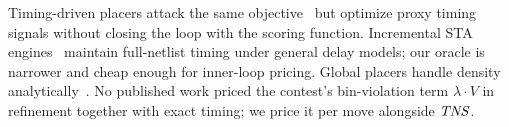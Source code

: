 Timing-driven placers attack the same objective~\cite{liao2022dreamplace4,date2025tddp,romanvicharra2024ffcentric} but optimize proxy timing signals without closing the loop with the scoring function. Incremental STA engines~\cite{huang2015opentimer,huang2021opentimer2} maintain full-netlist timing under general delay models; our oracle is narrower and cheap enough for inner-loop pricing. Global placers handle density analytically~\cite{lu2015eplace,chen2008ntuplace3}. No published work priced the contest's bin-violation term $\lambda \cdot V$ in refinement together with exact timing; we price it per move alongside $\mathit{TNS}$.
